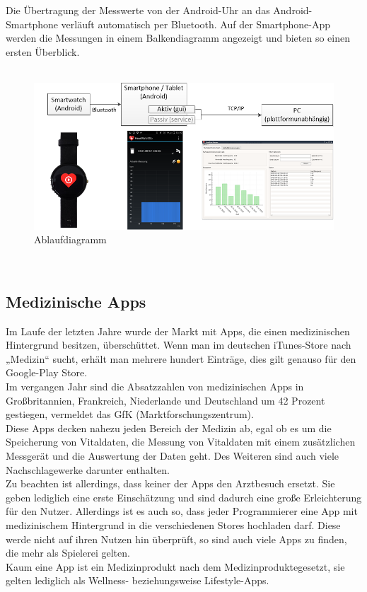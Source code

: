 Die Übertragung der Messwerte von der Android-Uhr an das Android-Smartphone verläuft automatisch per Bluetooth. Auf der Smartphone-App werden die Messungen in einem Balkendiagramm angezeigt und bieten so einen ersten Überblick. \\[0.5cm]
\\
\begin{figure} [H]
	\centering
				\includegraphics[scale=0.5]{images/ablauf.png}
		\caption{Ablaufdiagramm}
	\label{fig:ablauf}
\end{figure}
\\
\subsection{Medizinische Apps}\label{sec:Medizinische Apps}
Im Laufe der letzten Jahre wurde der Markt mit Apps, die einen medizinischen Hintergrund besitzen, überschüttet. Wenn man im deutschen iTunes-Store nach „Medizin“ sucht, erhält man mehrere hundert Einträge, dies gilt genauso für den Google-Play Store. \\[0.5cm]
Im vergangen Jahr sind die Absatzzahlen von medizinischen Apps in Großbritannien, Frankreich, Niederlande und Deutschland um 42 Prozent gestiegen, vermeldet das GfK (Marktforschungszentrum).\\
Diese Apps decken nahezu jeden Bereich der Medizin ab, egal ob es um die Speicherung von Vitaldaten, die Messung von Vitaldaten mit einem zusätzlichen Messgerät und die Auswertung der Daten geht. Des Weiteren sind auch viele Nachschlagewerke darunter enthalten.\\[0.5cm]
Zu beachten ist allerdings, dass keiner der Apps den Arztbesuch ersetzt. Sie geben lediglich eine erste Einschätzung und sind dadurch eine große Erleichterung für den Nutzer. Allerdings ist es auch so, dass jeder Programmierer eine App mit medizinischem Hintergrund in die verschiedenen Stores hochladen darf. Diese werde nicht auf ihren Nutzen hin überprüft, so sind auch viele Apps zu finden, die mehr als Spielerei gelten.\\[0.5cm]
Kaum eine App ist ein Medizinprodukt nach dem Medizinproduktegesetzt, sie gelten lediglich als Wellness- beziehungsweise Lifestyle-Apps. \\
\\

